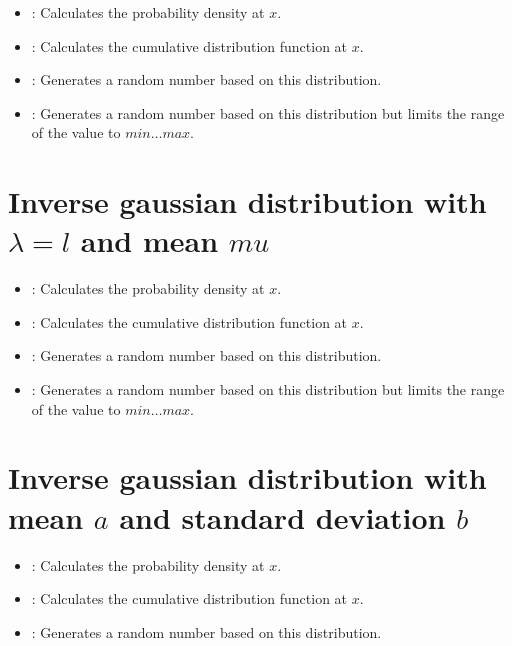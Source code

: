\begin{itemize}

\item
{}:
Calculates the probability density at $x$.

\item
{}:
Calculates the cumulative distribution function at $x$.

\item
{}:
Generates a random number based on this distribution.

\item
{}:
Generates a random number based on this distribution but limits the range of the value to $min\ldots max$.

\end{itemize}


	
\section{Inverse gaussian distribution with \texorpdfstring{$\lambda=l$}{l} and mean \texorpdfstring{$mu$}{mu}}

\begin{itemize}

\item
{}:
Calculates the probability density at $x$.

\item
{}:
Calculates the cumulative distribution function at $x$.

\item
{}:
Generates a random number based on this distribution.

\item
{}:
Generates a random number based on this distribution but limits the range of the value to $min\ldots max$.

\end{itemize}



\section{Inverse gaussian distribution with mean \texorpdfstring{$a$}{a} and standard deviation \texorpdfstring{$b$}{b}}

\begin{itemize}

\item
{}:
Calculates the probability density at $x$.

\item
{}:
Calculates the cumulative distribution function at $x$.

\item
{}:
Generates a random number based on this distribution.

\end{itemize}



